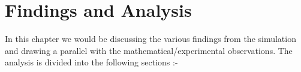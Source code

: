 \chapter*{Findings and Analysis}

In this chapter we would be discussing the various findings from the simulation and drawing a parallel with the mathematical/experimental observations. The analysis is divided into the following sections :-

\newpage\cleardoublepage

\newpage\cleardoublepage



